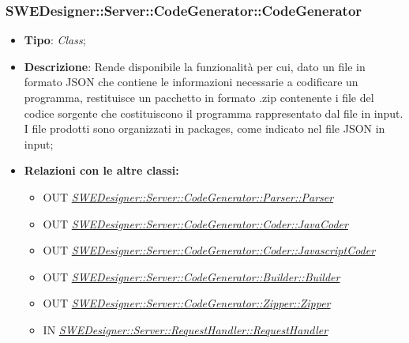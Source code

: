 \documentclass[../SpecificaTecnica.tex]{subfiles}
\begin{document}
			\subsubsection{SWEDesigner::Server::CodeGenerator::CodeGenerator}
			\hypertarget{SWEDesigner::Server::CodeGenerator::CodeGenerator}{}
			\begin{itemize}
				\item \textbf{Tipo}: \emph{Class};\\
				\item \textbf{Descrizione}: Rende disponibile la funzionalità per cui, dato un file in formato JSON che contiene le informazioni necessarie a codificare un programma, restituisce un pacchetto in formato .zip contenente i file del codice sorgente che costituiscono il programma rappresentato dal file in input. I file prodotti sono organizzati in packages, come indicato nel file JSON in input;\\
				\item \textbf{Relazioni con le altre classi:}
				\begin{itemize}
					\item OUT \hyperlink{SWEDesigner::Server::CodeGenerator::Parser::Parser}{\emph{SWEDesigner::Server::CodeGenerator::Parser::Parser}}
					\item OUT \hyperlink{SWEDesigner::Server::CodeGenerator::Coder::JavaCoder}{\emph{SWEDesigner::Server::CodeGenerator::Coder::JavaCoder}}
					\item OUT \hyperlink{SWEDesigner::Server::CodeGenerator::Coder::JavascriptCoder}{\emph{SWEDesigner::Server::CodeGenerator::Coder::JavascriptCoder}}
					\item OUT \hyperlink{SWEDesigner::Server::CodeGenerator::Builder::Builder}{\emph{SWEDesigner::Server::CodeGenerator::Builder::Builder}}
					\item OUT \hyperlink{SWEDesigner::Server::CodeGenerator::Zipper::Zipper}{\emph{SWEDesigner::Server::CodeGenerator::Zipper::Zipper}}
					\item IN \hyperlink{SWEDesigner::Server::RequestHandler::RequestHandler}{\emph{SWEDesigner::Server::RequestHandler::RequestHandler}}
				\end{itemize}	
			\end{itemize}
			
				
			
			
			
\end{document}
